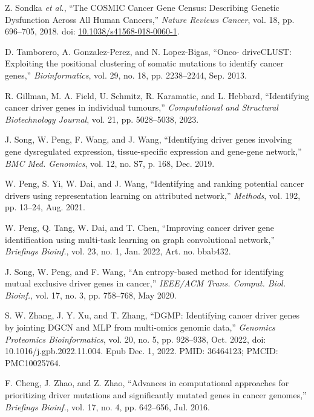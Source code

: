 \documentclass[conference]{IEEEtran}
\begin{document}
\begin{thebibliography}{99}
Z. Sondka \textit{et al.}, ``The COSMIC Cancer Gene Census: Describing Genetic Dysfunction Across All Human Cancers,'' \textit{Nature Reviews Cancer}, vol. 18, pp. 696–705, 2018. doi: \url{10.1038/s41568-018-0060-1}.

D. Tamborero, A. Gonzalez-Perez, and N. Lopez-Bigas, ``Onco- driveCLUST: Exploiting the positional clustering of somatic mutations to identify cancer genes,'' \textit{Bioinformatics}, vol. 29, no. 18, pp. 2238–2244, Sep. 2013.

R. Gillman, M. A. Field, U. Schmitz, R. Karamatic, and L. Hebbard, ``Identifying cancer driver genes in individual tumours,'' \textit{Computational and Structural Biotechnology Journal}, vol. 21, pp. 5028–5038, 2023.

J. Song, W. Peng, F. Wang, and J. Wang, ``Identifying driver genes involving gene dysregulated expression, tissue-specific expression and gene-gene network,'' \textit{BMC Med. Genomics}, vol. 12, no. S7, p. 168, Dec. 2019.

W. Peng, S. Yi, W. Dai, and J. Wang, ``Identifying and ranking potential cancer drivers using representation learning on attributed network,'' \textit{Methods}, vol. 192, pp. 13–24, Aug. 2021.

W. Peng, Q. Tang, W. Dai, and T. Chen, ``Improving cancer driver gene identification using multi-task learning on graph convolutional network,'' \textit{Briefings Bioinf.}, vol. 23, no. 1, Jan. 2022, Art. no. bbab432.


J. Song, W. Peng, and F. Wang, ``An entropy-based method for identifying mutual exclusive driver genes in cancer,'' \textit{IEEE/ACM Trans. Comput. Biol. Bioinf.}, vol. 17, no. 3, pp. 758–768, May 2020.

S. W. Zhang, J. Y. Xu, and T. Zhang, ``DGMP: Identifying cancer driver genes by jointing DGCN and MLP from multi-omics genomic data,'' \textit{Genomics Proteomics Bioinformatics}, vol. 20, no. 5, pp. 928–938, Oct. 2022, doi: 10.1016/j.gpb.2022.11.004. Epub Dec. 1, 2022. PMID: 36464123; PMCID: PMC10025764.

F. Cheng, J. Zhao, and Z. Zhao, ``Advances in computational approaches for prioritizing driver mutations and significantly mutated genes in cancer genomes,'' \textit{Briefings Bioinf.}, vol. 17, no. 4, pp. 642–656, Jul. 2016.


\end{thebibliography}
\end{document}
